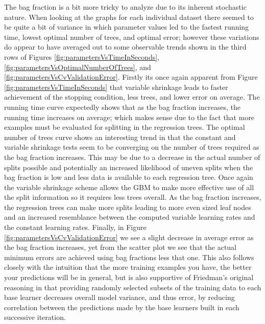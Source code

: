 \documentclass[9pt, conference]{IEEEtran}
\begin{document}
The bag fraction is a bit more tricky to analyze due to its inherent stochastic nature. When looking at the graphs for each individual dataset there seemed to be quite a bit of variance in which parameter values led to the fastest running time, lowest optimal number of trees, and optimal error; however these variations do appear to have averaged out to some observable trends shown in the third rows of Figures \ref{fig:parametersVsTimeInSeconds},
\ref{fig:parametersVsOptimalNumberOfTrees}, and
\ref{fig:parametersVsCvValidationError}. Firstly its once again apparent from Figure \ref{fig:parametersVsTimeInSeconds} that variable shrinkage leads to faster achievement of the stopping condition, less trees, and lower error on average. The running time curve expectedly shows that as the bag fraction increases, the running time increases on average; which makes sense due to the fact that more examples must be evaluated for splitting in the regression trees. The optimal number of trees curve shows an interesting trend in that the constant and variable shrinkage tests seem to be converging on the number of trees required as the bag fraction increases. This may be due to a decrease in the actual number of splits possible and potentially an increased likelihood of uneven splits when the bag fraction is low and less data is available to each regression tree. Once again the variable shrinkage scheme allows the GBM to make more effective use of all the split information so it requires less trees overall. As the bag fraction increases, the regression trees can make more splits leading to more even sized leaf nodes and an increased resemblance between the computed variable learning rates and the constant learning rates. Finally, in Figure \ref{fig:parametersVsCvValidationError} we see a slight decrease in average error as the bag fraction increases, yet from the scatter plot we see that the actual minimum errors are achieved using bag fractions less that one. This also follows closely with the intuition that the more training examples you have, the better your predictions will be in general, but is also supportive of Friedman's original reasoning in \cite{2002Friedman} that providing randomly selected subsets of the training data to each base learner decreases overall model variance, and thus error, by reducing correlation between the predictions made by the base learners built in each successive iteration.
\end{document}
